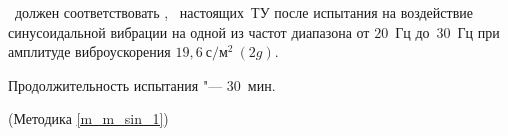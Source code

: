 \dut \ должен соответствовать \treb, \trebafter \ настоящих~ТУ после испытания на воздействие синусоидальной вибрации на одной из частот диапазона от $20$~Гц до~$30$~Гц при амплитуде виброускорения $19,6~\text{с}/\text{м}^2~(2g)$.

Продолжительность испытания "--- $30$~мин.

\begin{flushright}
	(Методика \ref{m_m_sin_1})
\end{flushright}